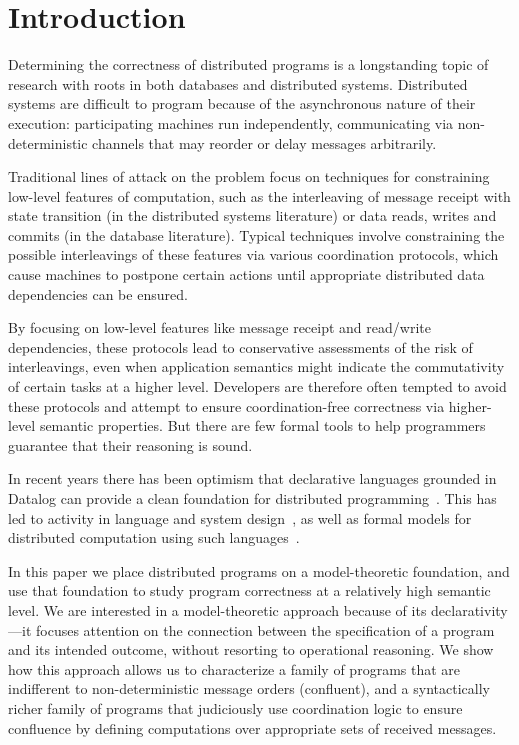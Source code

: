\section{Introduction}
Determining the correctness of distributed programs is a longstanding topic of research with roots in both databases and distributed systems.  Distributed systems are difficult to program because of the asynchronous nature of their execution: participating machines run independently, communicating via non-deterministic channels that may reorder or delay messages arbitrarily.  

Traditional lines of attack on the problem focus on techniques for constraining low-level features of computation, such as the interleaving of message receipt with state transition (in the distributed systems literature) or data reads, writes and commits (in the database literature).  Typical techniques involve constraining the possible interleavings of these features via various coordination protocols, which cause machines to postpone certain actions until appropriate distributed data dependencies can be ensured.

By focusing on low-level features like message receipt and read/write dependencies, these protocols lead to conservative assessments of the risk of interleavings, even when application semantics might indicate the commutativity of certain tasks at a higher level. Developers are therefore often tempted to avoid these protocols and attempt to ensure coordination-free correctness via higher-level semantic properties.  But there are few formal tools to help programmers guarantee that their reasoning is sound.

In recent years there has been optimism that declarative languages grounded in Datalog can provide a clean foundation for distributed programming~\cite{declarative-imperative}.  This has led to activity in language and system design~\cite{declarative-distributed-languages}, as well as formal models for distributed computation using such languages~\cite{relational-transducers,what}.  

In this paper we place distributed programs on a model-theoretic foundation, and use that foundation to study program correctness at a relatively high semantic level.  We are interested in a model-theoretic approach because of its declarativity---it focuses attention on the connection between the specification of a program and its intended outcome, without resorting to operational reasoning.  We show how this approach allows us to characterize a family of programs that are indifferent to non-deterministic message orders (confluent), and a syntactically richer family of programs that judiciously use coordination logic to ensure confluence by defining computations over appropriate sets of received messages.

